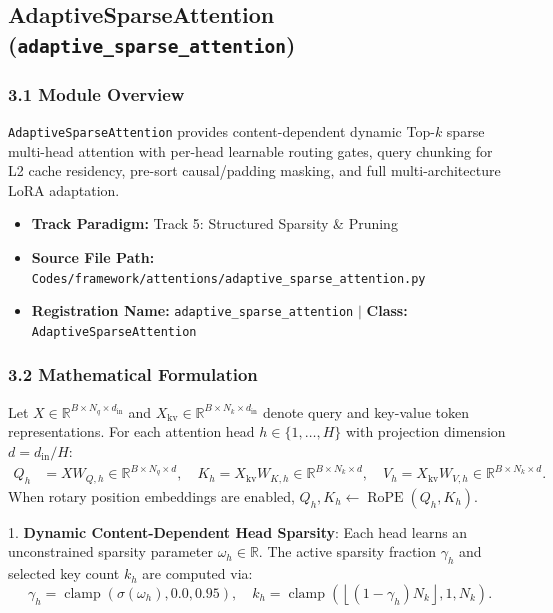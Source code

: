 \subsection{AdaptiveSparseAttention (\texttt{adaptive\_sparse\_attention})}
\label{sec:app_module_adaptive_sparse_attention}

\subsubsection*{3.1 Module Overview}
\texttt{AdaptiveSparseAttention} provides content-dependent dynamic Top-$k$ sparse multi-head attention with per-head learnable routing gates, query chunking for L2 cache residency, pre-sort causal/padding masking, and full multi-architecture LoRA adaptation.
\begin{itemize}
    \item \textbf{Track Paradigm:} Track 5: Structured Sparsity \& Pruning
    \item \textbf{Source File Path:} \texttt{Codes/framework/attentions/adaptive\_sparse\_attention.py}
    \item \textbf{Registration Name:} \texttt{adaptive\_sparse\_attention} $\mid$ \textbf{Class:} \texttt{AdaptiveSparseAttention}
\end{itemize}

\subsubsection*{3.2 Mathematical Formulation}
Let $X \in \mathbb{R}^{B \times N_q \times d_{\text{in}}}$ and $X_{\text{kv}} \in \mathbb{R}^{B \times N_k \times d_{\text{in}}}$ denote query and key-value token representations. For each attention head $h \in \{1, \dots, H\}$ with projection dimension $d = d_{\text{in}} / H$:
\begin{align}
Q_h &= X W_{Q,h} \in \mathbb{R}^{B \times N_q \times d}, \quad K_h = X_{\text{kv}} W_{K,h} \in \mathbb{R}^{B \times N_k \times d}, \quad V_h = X_{\text{kv}} W_{V,h} \in \mathbb{R}^{B \times N_k \times d}.
\end{align}
When rotary position embeddings are enabled, $Q_h, K_h \leftarrow \operatorname{RoPE}(Q_h, K_h)$.

1. \textbf{Dynamic Content-Dependent Head Sparsity}: Each head learns an unconstrained sparsity parameter $\omega_h \in \mathbb{R}$. The active sparsity fraction $\gamma_h$ and selected key count $k_h$ are computed via:
\begin{equation}
\gamma_h = \operatorname{clamp}\left(\sigma(\omega_h), 0.0, 0.95\right), \quad k_h = \operatorname{clamp}\left(\left\lfloor (1 - \gamma_h) N_k \right\rfloor, 1, N_k\right).
\end{equation}


